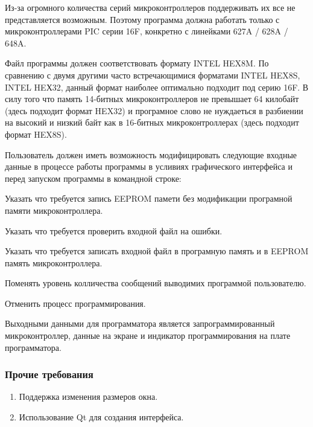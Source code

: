 \begin{my_enumerate}
\item Из-за огромного количества серий микроконтроллеров поддерживать их все не представляется возможным. Поэтому программа должна работать только с микроконтроллерами PIC серии 16F, конкретно с линейками 627A / 628A / 648A.
\item Файл программы должен соответствовать формату INTEL HEX8M. По сравнению с двумя другими часто встречающимися форматами INTEL HEX8S, INTEL HEХ32, данный формат наиболее оптимально подходит под серию 16F. В силу того что память 14-битных микроконтроллеров не превышает 64 килобайт (здесь подходит формат HEX32) и програмное слово не нуждаеться в разбиении на высокий и низкий байт как в 16-битных микроконтроллерах (здесь подходит формат HEX8S).
\item Пользователь должен иметь возможность модифицировать следующие входные данные в процессе работы программы в усливиях графического интерфейса и перед запуском программы в командной строке:
\begin{my_enumerate}
\item Указать что требуется запись EEPROM памети без модификации програмной памяти микроконтроллера.
\item Указать что требуется проверить входной файл на ошибки.
\item Указать что требуется записать входной файл в програмную память и в EEPROM память микроконтроллера.
\item Поменять уровень колличества сообщений выводимих программой пользователю.
\item Отменить процесс программирования.
\end{my_enumerate}
\end{my_enumerate}

\medskip
Выходными данными для программатора является запрограммированный микроконтроллер, данные на экране и индикатор программирования на плате программатора.


\subsubsection{Прочие требования}
\begin{enumerate}
\item Поддержка изменения размеров окна.
\item Использование Qt для создания интерфейса.
\end{enumerate}

